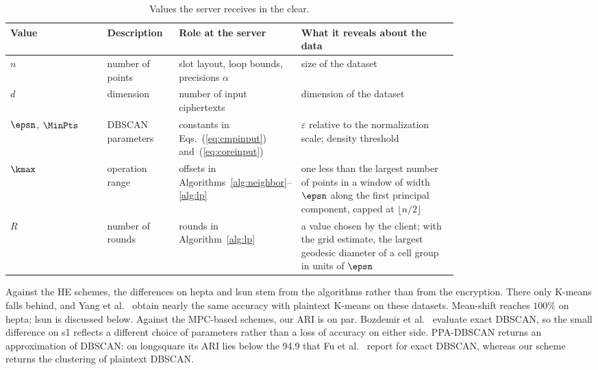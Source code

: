 \begin{table}[t]
\centering
\caption{Values the server receives in the clear.}
\label{tab:leakage}
\small
\renewcommand{\arraystretch}{1.15}
\begin{tabular}{@{}l p{0.16\linewidth} p{0.25\linewidth} p{0.35\linewidth}@{}}
\toprule
Value & Description & Role at the server & What it reveals about the data
  \tabularnewline
\midrule
$n$ & \raggedright number of points
    & \raggedright slot layout, loop bounds, precisions $\alpha$
    & \raggedright size of the dataset \tabularnewline
$d$ & \raggedright dimension
    & \raggedright number of input ciphertexts
    & \raggedright dimension of the dataset \tabularnewline
$\epsn$, $\MinPts$
    & \raggedright DBSCAN parameters
    & \raggedright constants in Eqs.~(\ref{eq:cmpinput}) and~(\ref{eq:coreinput})
    & \raggedright $\varepsilon$ relative to the normalization scale;
      density threshold \tabularnewline
$\kmax$
    & \raggedright operation range
    & \raggedright offsets in Algorithms~\ref{alg:neighbor}--\ref{alg:lp}
    & \raggedright one less than the largest number of points in a window
      of width $\epsn$ along the first principal component, capped at
      $\lfloor n/2 \rfloor$ \tabularnewline
$R$ & \raggedright number of rounds
    & \raggedright rounds in Algorithm~\ref{alg:lp}
    & \raggedright a value chosen by the client; with the grid estimate,
      the largest geodesic diameter of a cell group in units of $\epsn$
      \tabularnewline
\bottomrule
\end{tabular}
\end{table}

Against the HE schemes, the differences on hepta and lsun stem from the
algorithms rather than from the encryption. There only K-means falls
behind, and Yang et al.~\cite{yang2024optimized} obtain nearly the same
accuracy with plaintext K-means on these datasets. Mean-shift reaches
$100\%$ on hepta; lsun is discussed below. Against the MPC-based schemes, our
ARI is on par. Bozdemir et al.~\cite{bozdemir2021privacy} evaluate exact
DBSCAN, so the small difference on s1 reflects a different choice of
parameters rather than a loss of accuracy on either side. PPA-DBSCAN
returns an approximation of DBSCAN: on longsquare its ARI lies below the
94.9 that Fu et al.~\cite{fu2024ppa} report for exact DBSCAN, whereas our
scheme returns the clustering of plaintext DBSCAN.

